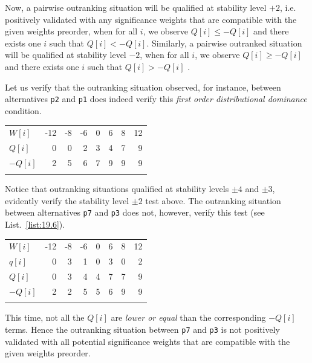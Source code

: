 Now, a pairwise outranking situation will be qualified at stability level $+2$, i.e. positively validated with any significance weights that are compatible with the given weights preorder, when for all $i$, we observe $Q[i] \leq -Q[i]$ and there exists one $i$ such that $Q[i] < -Q[i]$. Similarly, a pairwise outranked situation will be qualified at stability level $-2$, when for all $i$, we observe $Q[i] \geq -Q[i]$ and there exists one $i$ such that $Q[i] > -Q[i]$ \citep{BIS-2004c}.

Let us verify that the outranking situation observed, for instance, between alternatives \texttt{p2} and \texttt{p1} does indeed verify this \emph{first order distributional dominance} condition. \hfill
\begin{center}
\begin{tabular}{l|r|r|r|r|r|r|r}
 \svhline\noalign{\smallskip}
  $W[i]$ & -12 & -8  & -6  &  0  &  6  &  8 &  12\\  
 \noalign{\smallskip}\hline\noalign{\smallskip}
  $Q[i]$  &  0 &  0 &   2 &   3  &  4  &  7  &  9 \\
  $-Q[i]$  &  2 &  5 &   6 &   7  &  9  &  9  &  9 \\
 \noalign{\smallskip}\hline
\end{tabular}
\end{center}

Notice that outranking situations qualified at stability levels $\pm 4$ and $\pm 3$, evidently verify the stability level $\pm 2$ test above. The outranking situation between alternatives \texttt{p7} and \texttt{p3} does not, however, verify this test (see List.~\vref{list:19.6}).\hfill
\begin{center}
\begin{tabular}{l|r|r|r|r|r|r|r}
 \svhline\noalign{\smallskip}
  $W[i]$ & -12 & -8  & -6  &  0  &  6  &  8 &  12\\  
 \noalign{\smallskip}\hline\noalign{\smallskip}
  $q[i]$  &  0 &  3 &   1 &   0  &  3  &  0  &  2 \\
  $Q[i]$  &  0 &  3 &   4 &   4  &  7  &  7  &  9 \\
  $-Q[i]$  &  2 &  2 &   5 &   5  &  6  &  9  &  9 \\
 \noalign{\smallskip}\hline
\end{tabular}
\end{center}

This time, not all the $Q[i]$ are \emph{lower or equal} than the corresponding $-Q[i]$ terms. Hence the outranking situation between \texttt{p7} and \texttt{p3} is not positively validated with all potential significance weights that are compatible with the given weights preorder.

